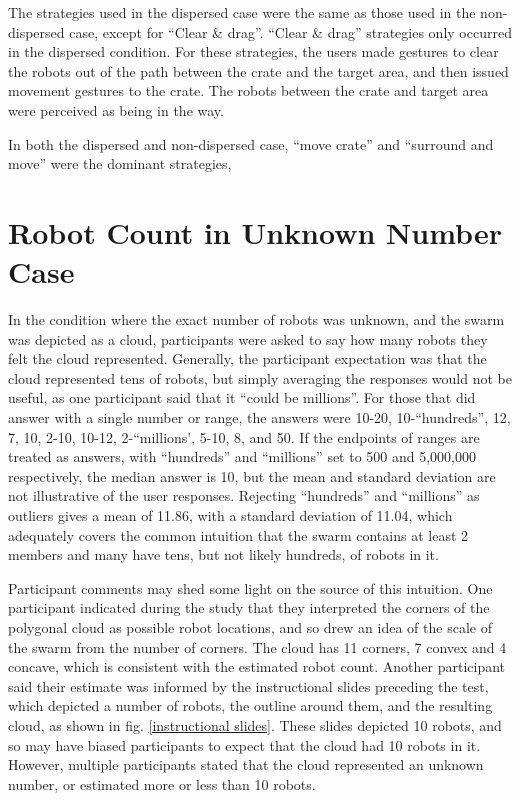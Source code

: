 The strategies used in the dispersed case were the same as those used in the non-dispersed case, except for ``Clear \& drag''.
``Clear \& drag'' strategies only occurred in the dispersed condition. 
For these strategies, the users made gestures to clear the robots out of the path between the crate and the target area, and then issued movement gestures to the crate. 
The robots between the crate and target area were perceived as being in the way. 

In both the dispersed and non-dispersed case, ``move crate'' and ``surround and move'' were the dominant strategies, 

%
\section{Robot Count in Unknown Number Case} \label{section:Robot_Count_in_Unknown_Number_Case}

In the condition where the exact number of robots was unknown, and the swarm was depicted as a cloud, participants were asked to say how many robots they felt the cloud represented. 
Generally, the participant expectation was that the cloud represented tens of robots, but simply averaging the responses would not be useful, as one participant said that it ``could be millions''. 
For those that did answer with a single number or range, the answers were 10-20, 10-``hundreds'', 12, 7, 10, 2-10, 10-12, 2-``millions', 5-10, 8, and 50. 
If the endpoints of ranges are treated as answers, with ``hundreds'' and ``millions'' set to 500 and 5,000,000 respectively, the median answer is 10, but the mean and standard deviation are not illustrative of the user responses. 
Rejecting ``hundreds'' and ``millions'' as outliers gives a mean of 11.86, with a standard deviation of 11.04, which adequately covers the common intuition that the swarm contains at least 2 members and many have tens, but not likely hundreds, of robots in it.

Participant comments may shed some light on the source of this intuition. 
One participant indicated during the study that they interpreted the corners of the polygonal cloud as possible robot locations, and so drew an idea of the scale of the swarm from the number of corners. 
The cloud has 11 corners, 7 convex and 4 concave, which is consistent with the estimated robot count. 
Another participant said their estimate was informed by the instructional slides preceding the test, which depicted a number of robots, the outline around them, and the resulting cloud, as shown in fig. \ref{instructional slides}. 
These slides depicted 10 robots, and so may have biased participants to expect that the cloud had 10 robots in it. 
However, multiple participants stated that the cloud represented an unknown number, or estimated more or less than 10 robots.

